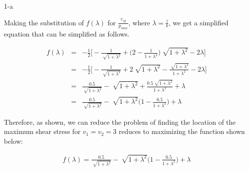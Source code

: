 \documentclass[11pt]{article}
\begin{document}
\begin{prob}{1-a}
\end{prob}
\begin{sol} 

Making the substitution of $f(\lambda)$ for $\frac{\tau_{zy}}{p_{max}}$, where $\lambda = \frac{z}{b}$, we get a simplified equation that can be simplified as follows.

\begin{eqnarray*}
f(\lambda) & = & -\frac{1}{2}\Bigg[ -\frac{1}{\sqrt[]{1 + \lambda^2}} +  \Bigg(2 - \frac{1}{1 + \lambda^2}\Bigg) \sqrt[]{1 + \lambda^2} -2\lambda \Bigg] \\
& = & -\frac{1}{2}\Bigg[ -\frac{1}{\sqrt[]{1 + \lambda^2}} +  2\sqrt[]{1 + \lambda^2} - \frac{\sqrt[]{1 + \lambda^2}}{1 + \lambda^2} -2\lambda \Bigg] \\
& = & \frac{0.5}{\sqrt[]{1 + \lambda^2}} - \sqrt[]{1 + \lambda^2} + \frac{0.5\sqrt[]{1 + \lambda^2}}{1 + \lambda^2} + \lambda \\
& = & \frac{0.5}{\sqrt[]{1 + \lambda^2}} - \sqrt[]{1 + \lambda^2}\Bigg(1 - \frac{0.5}{1 + \lambda^2}\Bigg) + \lambda
\end{eqnarray*}

Therefore, as shown, we can reduce the problem of finding the location of the maximum shear stress for $v_{1} = v_{2} = 3$ reduces to maximizing the function shown below:

\begin{eqnarray}
\label{OriginalFunc}
f(\lambda) = \frac{0.5}{\sqrt[]{1 + \lambda^2}} - \sqrt[]{1 + \lambda^2}\Bigg(1 - \frac{0.5}{1 + \lambda^2}\Bigg) + \lambda
\end{eqnarray}

\end{sol}
\end{document}
